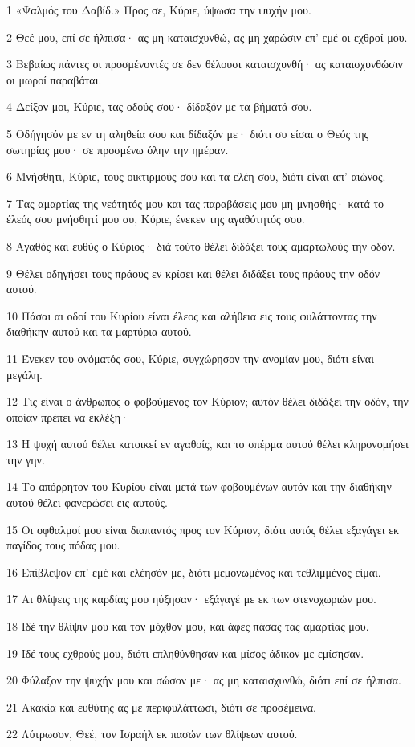 \par 1 «Ψαλμός του Δαβίδ.» Προς σε, Κύριε, ύψωσα την ψυχήν μου.
\par 2 Θεέ μου, επί σε ήλπισα· ας μη καταισχυνθώ, ας μη χαρώσιν επ' εμέ οι εχθροί μου.
\par 3 Βεβαίως πάντες οι προσμένοντές σε δεν θέλουσι καταισχυνθή· ας καταισχυνθώσιν οι μωροί παραβάται.
\par 4 Δείξον μοι, Κύριε, τας οδούς σου· δίδαξόν με τα βήματά σου.
\par 5 Οδήγησόν με εν τη αληθεία σου και δίδαξόν με· διότι συ είσαι ο Θεός της σωτηρίας μου· σε προσμένω όλην την ημέραν.
\par 6 Μνήσθητι, Κύριε, τους οικτιρμούς σου και τα ελέη σου, διότι είναι απ' αιώνος.
\par 7 Τας αμαρτίας της νεότητός μου και τας παραβάσεις μου μη μνησθής· κατά το έλεός σου μνήσθητί μου συ, Κύριε, ένεκεν της αγαθότητός σου.
\par 8 Αγαθός και ευθύς ο Κύριος· διά τούτο θέλει διδάξει τους αμαρτωλούς την οδόν.
\par 9 Θέλει οδηγήσει τους πράους εν κρίσει και θέλει διδάξει τους πράους την οδόν αυτού.
\par 10 Πάσαι αι οδοί του Κυρίου είναι έλεος και αλήθεια εις τους φυλάττοντας την διαθήκην αυτού και τα μαρτύρια αυτού.
\par 11 Ένεκεν του ονόματός σου, Κύριε, συγχώρησον την ανομίαν μου, διότι είναι μεγάλη.
\par 12 Τις είναι ο άνθρωπος ο φοβούμενος τον Κύριον; αυτόν θέλει διδάξει την οδόν, την οποίαν πρέπει να εκλέξη·
\par 13 Η ψυχή αυτού θέλει κατοικεί εν αγαθοίς, και το σπέρμα αυτού θέλει κληρονομήσει την γην.
\par 14 Το απόρρητον του Κυρίου είναι μετά των φοβουμένων αυτόν και την διαθήκην αυτού θέλει φανερώσει εις αυτούς.
\par 15 Οι οφθαλμοί μου είναι διαπαντός προς τον Κύριον, διότι αυτός θέλει εξαγάγει εκ παγίδος τους πόδας μου.
\par 16 Επίβλεψον επ' εμέ και ελέησόν με, διότι μεμονωμένος και τεθλιμμένος είμαι.
\par 17 Αι θλίψεις της καρδίας μου ηύξησαν· εξάγαγέ με εκ των στενοχωριών μου.
\par 18 Ιδέ την θλίψιν μου και τον μόχθον μου, και άφες πάσας τας αμαρτίας μου.
\par 19 Ιδέ τους εχθρούς μου, διότι επληθύνθησαν και μίσος άδικον με εμίσησαν.
\par 20 Φύλαξον την ψυχήν μου και σώσον με· ας μη καταισχυνθώ, διότι επί σε ήλπισα.
\par 21 Ακακία και ευθύτης ας με περιφυλάττωσι, διότι σε προσέμεινα.
\par 22 Λύτρωσον, Θεέ, τον Ισραήλ εκ πασών των θλίψεων αυτού.

